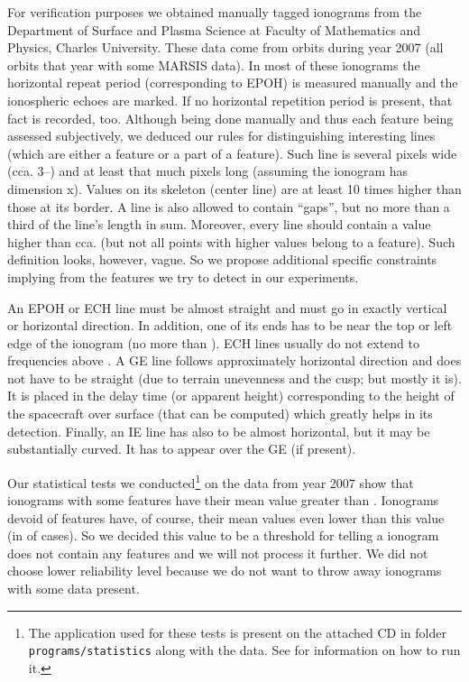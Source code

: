 For verification purposes we obtained  manually tagged ionograms from the Department of Surface and Plasma Science at Faculty of Mathematics and Physics, Charles University. These data come from  orbits during year 2007 (all orbits that year with some MARSIS data). In most of these ionograms the horizontal repeat period (corresponding to EPOH) is measured manually and the ionospheric echoes are marked. If no horizontal repetition period is present, that fact is recorded, too. Although being done manually and thus each feature being assessed subjectively, we deduced our rules for distinguishing interesting lines (which are either a feature or a part of a feature). Such line is several pixels wide (cca. 3--) and at least that much pixels long (assuming the ionogram has dimension x). Values on its skeleton (center line) are at least 10 times higher than those at its border. A line is also allowed to contain ``gaps'', but no more than a third of the line's length in sum. Moreover, every line should contain a value higher than cca.  (but not all points with higher values belong to a feature). Such definition looks, however, vague. So we propose additional specific constraints implying from the features we try to detect in our experiments. 

An EPOH or ECH line must be almost straight and must go in exactly vertical or horizontal direction. In addition, one of its ends has to be near the top or left edge of the ionogram (no more than ). ECH lines usually do not extend to frequencies above . A GE line follows approximately horizontal direction and does not have to be straight (due to terrain unevenness and the cusp; but mostly it is). It is placed in the delay time (or apparent height) corresponding to the height of the spacecraft over surface (that can be computed) which greatly helps in its detection. Finally, an IE line has also to be almost horizontal, but it may be substantially curved. It has to appear over the GE (if present).

Our statistical tests we conducted\footnote{The application used for these tests is present on the attached CD in folder \texttt{programs/statistics} along with the data. See  for information on how to run it.} on the data from year 2007 show that  ionograms with some features have their mean value greater than . Ionograms devoid of features have, of course, their mean values even lower than this value (in  of cases). So we decided this value to be a threshold for telling a ionogram does not contain any features and we will not process it further. We did not choose lower reliability level because we do not want to throw away ionograms with some data present.

